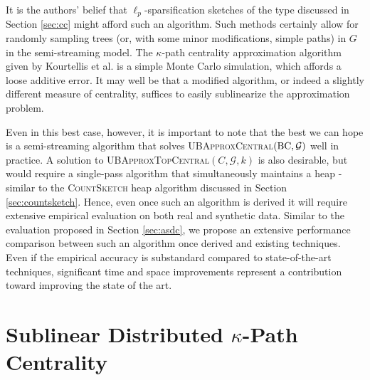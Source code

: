 \documentclass{report}
\newcommand{\algoname}[1]{\textnormal{\textsc{#1}}}
\begin{document}
It is the authors' belief that $\ell_p$-sparsification sketches of the type discussed in Section \ref{sec:cc} might afford such an algorithm. 
Such methods certainly allow for randomly sampling trees (or, with some minor modifications, simple paths) in $G$ in the semi-streaming model.
The $\kappa$-path centrality approximation algorithm given by Kourtellis et al. is a simple Monte Carlo simulation, which affords a loose additive error.
It may well be that a modified algorithm, or indeed a slightly different measure of centrality, suffices to easily sublinearize the approximation problem.

Even in this best case, however, it is important to note that the best we can hope is a semi-streaming algorithm that solves \algoname{UBApproxCentral}$(\textnormal{BC}, \mathcal{G})$ well in practice. 
A solution to \algoname{UBApproxTopCentral}$(C, \mathcal{G}, k)$ is also desirable, but would require a single-pass algorithm that simultaneously maintains a heap - similar to the \algoname{CountSketch} heap algorithm discussed in Section \ref{sec:countsketch}. 
Hence, even once such an algorithm is derived it will require extensive empirical evaluation on both real and synthetic data.
Similar to the evaluation proposed in Section \ref{sec:asdc}, we propose an extensive performance comparison between such an algorithm once derived and existing techniques. 
Even if the empirical accuracy is substandard compared to state-of-the-art techniques, significant time and space improvements represent a contribution toward improving the state of the art. 


\section{Sublinear Distributed $\kappa$-Path Centrality}
 \label{kpath:sec:alg}
\end{document}
